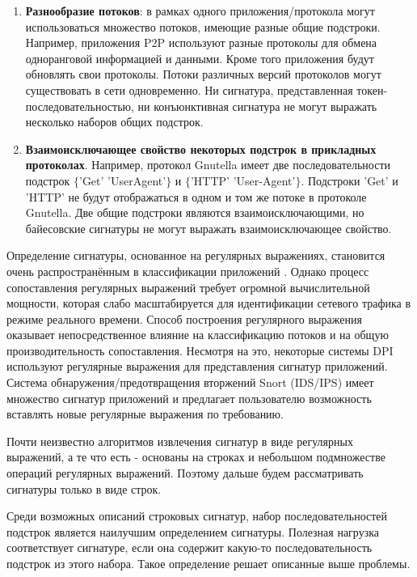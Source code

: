 \begin{enumerate}
    \item \textbf{Разнообразие потоков}: в рамках одного приложения/протокола могут использоваться множество потоков,
    имеющие разные общие подстроки. Например, приложения P2P используют разные протоколы для обмена одноранговой информацией и данными.
    Кроме того приложения будут обновлять свои протоколы.
    Потоки различных версий протоколов могут существовать в сети одновременно.
    Ни сигнатура, представленная токен-последовательностью,
    ни конъюнктивная сигнатура не могут выражать несколько наборов общих подстрок.
    \item \textbf{Взаимоисключающее свойство некоторых подстрок в прикладных протоколах}.
    Например, протокол Gnutella имеет две последовательности подстрок $\{$'Get' 'UserAgent'$\}$ и $\{$'HTTP' 'User-Agent'$\}$.
    Подстроки 'Get' и 'HTTP' не будут отображаться в одном и том же потоке в протоколе Gnutella.
    Две общие подстроки являются взаимоисключающими, но байесовские сигнатуры не могут выражать взаимоисключающее свойство.
\end{enumerate}

Определение сигнатуры, основанное на регулярных выражениях, становится очень распространённым в классификации приложений
\cite{szabo2012automatic, wang2012generating, vinothgeorge2013efficient}.
Однако процесс сопоставления регулярных выражений требует огромной вычислительной мощности,
которая слабо масштабируется для идентификации сетевого трафика в режиме реального времени.
Способ построения регулярного выражения оказывает непосредственное влияние на классификацию потоков
и на общую производительность сопоставления.
Несмотря на это, некоторые системы DPI используют регулярные выражения для представления сигнатур приложений.
Система обнаружения/предотвращения вторжений Snort (IDS/IPS) \cite{Snort}
имеет множество сигнатур приложений и предлагает пользователю возможность вставлять новые регулярные выражения по требованию.

Почти неизвестно алгоритмов извлечения сигнатур в виде регулярных выражений, а те что есть -
основаны на строках и небольшом подмножестве операций регулярных выражений.
Поэтому дальше будем рассматривать сигнатуры только в виде строк.

Среди возможных описаний строковых сигнатур, набор последовательностей подстрок является наилучшим определением сигнатуры.
Полезная нагрузка соответствует сигнатуре, если она содержит какую-то последовательность подстрок из этого набора.
Такое определение решает описанные выше проблемы.

